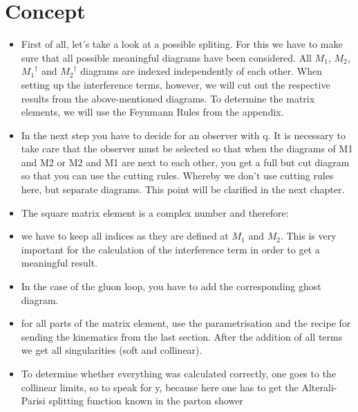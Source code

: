 \section*{Concept}
\label{Concept}
\begin{itemize}
\item First of all, let's take a look at a possible spliting. For this we have to make sure that all possible meaningful diagrams have been considered.
All $ M_1 $, $ M_2 $, $ {M_1}^{\dagger} $ and $ {M_2}^{\dagger}$ diagrams are indexed independently of each other. When setting up the interference terms, however, we will cut out the respective results from the above-mentioned diagrams. To determine the matrix elements, we will use the Feynmann Rules from the appendix.
\item In the next step you have to decide for an observer with q. It is necessary to take care that the observer must be selected so that when the diagrams of M1 and M2 or M2 and M1 are next to each other, you get a full but cut diagram so that you can use the cutting rules. Whereby we don't use cutting rules here, but separate diagrams. This point will be clarified in the next chapter.
\item The square matrix element is a complex number and therefore:
\item we have to keep all indices as they are defined at $M_1$ and $M_2$. This is very important for the calculation of the interference term in order to get a meaningful result.
\item In the case of the gluon loop, you have to add the corresponding ghost diagram.
\item for all parts of the matrix element, use the parametrisation and the recipe for sending the kinematics from the last section.
After the addition of all terms we get all singularities (soft and collinear). 
\item To determine whether everything was calculated correctly, one goes to the collinear limits, so to speak for y, because here one has to get the Alterali-Parisi splitting function known in the parton shower
\end{itemize}